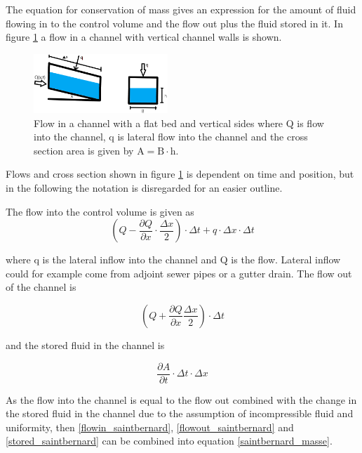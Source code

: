 The equation for conservation of mass gives an expression for the amount of fluid flowing in to the control volume and the flow out plus the fluid stored in it.
In figure \ref{fig:firkant_kloak} a flow in a channel with vertical channel walls is shown.

\begin{figure}[H]
\centering
\includegraphics[width=0.45\textwidth]{report/modeling/pictures/firkant_kloak.png}
\caption{Flow in a channel with a flat bed and vertical sides where Q is flow into the channel, q is lateral flow into the channel and the cross section area is given by $\text{A} = \text{B} \cdot \text{h}$. }
\label{fig:firkant_kloak}
\end{figure}

Flows and cross section shown in figure \ref{fig:firkant_kloak} is dependent on time and position, but in the following the notation is disregarded for an easier outline. 

The flow into the control volume is given as
\begin{equation}
	\left(Q - \frac{\partial Q}{\partial x}\cdot \frac{\Delta x}{2}\right) \cdot \Delta t + q \cdot \Delta x \cdot \Delta t
\label{flowin_saintbernard}
\end{equation}

where q is the lateral inflow into the channel and Q is the flow. Lateral inflow could for example come from adjoint sewer pipes or a gutter drain.
The flow out of the channel is

\begin{equation}
\left(Q + \frac{\partial Q}{ \partial x} \frac{\Delta x}{2} \right) \cdot \Delta t 
\label{flowout_saintbernard}
\end{equation}

and the stored fluid in the channel is

\begin{equation}
\frac{\partial A}{\partial t}\cdot \Delta t \cdot \Delta x	
\label{stored_saintbernard}
\end{equation}

As the flow into the channel is equal to the flow out combined with the change in the stored fluid in the channel due to the assumption of incompressible fluid and uniformity, then \ref{flowin_saintbernard}, \ref{flowout_saintbernard} and \ref{stored_saintbernard} can be combined into equation \ref{saintbernard_masse}. 

